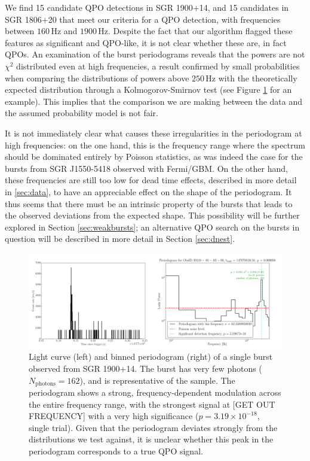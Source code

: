 \documentclass[numberedappendix]{emulateapj}
\newcommand{\hz}{\,\mathrm{Hz}}
\begin{document}
We find 15 candidate QPO detections in SGR 1900+14, and 15 candidates in SGR 1806+20 that meet our criteria for a QPO detection, with frequencies between $160\hz$ and $1900\hz$. Despite the fact that our algorithm
flagged these features as significant and QPO-like, it is not clear whether these are, in fact QPOs. An examination of the burst periodograms reveals that the powers are not $\chi^2$ distributed even at high frequencies,
a result confirmed by small probabilities when comparing the distributions of powers above $250 \hz$ with the theoretically expected distribution through a Kolmogorov-Smirnov test (see Figure \ref{fig:psd_individual_example} for
an example). This implies that the comparison we are making between the data and the assumed probability model is not fair.

It is not immediately clear what causes these irregularities in the periodogram at high frequencies: on the one hand, this is the frequency range where the spectrum should be dominated entirely by Poisson statistics,
as was indeed the case for the bursts from SGR J1550-5418 observed with Fermi/GBM. On the other hand, these frequencies are still too low for dead time effects, described in more detail in \ref{sec:data}, to have an
appreciable effect on the shape of the periodogram. It thus seems that there must be an intrinsic property of the bursts that leads to the observed deviations from the expected shape. This possibility will be further
explored in Section \ref{sec:weakbursts}; an alternative QPO search on the bursts in question will be described in more detail in Section \ref{sec:dnest}.



\begin{figure}[htbp]
\begin{center}
\includegraphics[width=18cm]{sgr1900_burst_example.png}
\caption{Light curve (left) and binned periodogram (right) of a single burst observed from SGR 1900+14. The burst has very few photons ($N_{\mathrm{photons}} = 162$), and is representative of the sample. The periodogram shows a strong, frequency-dependent modulation across the entire frequency range, with the strongest signal at [GET OUT FREQUENCY] with a very high significance ($p = 3.19 \times 10^{-18}$, single trial). Given that the periodogram deviates strongly from the distributions we test against, it is unclear whether this peak in the periodogram corresponds to a true QPO signal.}
\label{fig:psd_individual_example}
\end{center}
\end{figure}
\end{document}
